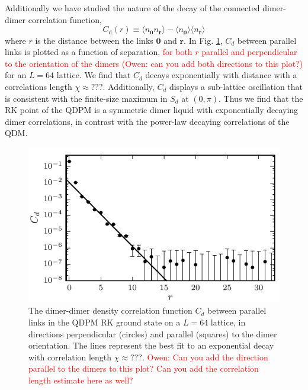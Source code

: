 \documentclass[twocolumn,prb,aps,floatfix,superscriptaddress]{revtex4-1}
\newcommand{\figref}[1]{Fig. \ref{#1}}
\newcommand{\note}[1]{\textcolor{red}{#1}}
\begin{document}
Additionally we have studied the nature of the decay of the connected dimer-dimer correlation function,
  \begin{equation}
    C_{\mathrm{d}} \left(r\right) \equiv \langle n_{\bm{0}} n_{\bm{r}} \rangle - \langle n_{\bm{0}} \rangle   \langle n_{\bm{r}} \rangle   
\end{equation}
where $r$ is the distance between the links $\bm{0}$ and $\bm{r}$. In \figref{fig:spatial_dmr_cor}, $C_d$ between parallel links is plotted as a function of separation, \textcolor{red}{for both $r$ parallel and perpendicular to the orientation of the dimers} \note{(Owen: can you add both directions to this plot?)} for an $L=64$ lattice. We find that $C_d$ decays exponentially with distance with a correlations length  $\chi\approx???$. Additionally, $C_d$ displays a sub-lattice oscillation that is consistent with the finite-size maximum in $S_d$ at $(0,\pi)$. Thus we find that the RK point of the QDPM is a symmetric dimer liquid with exponentially decaying dimer correlations, in contrast with the power-law decaying correlations of the QDM.

\begin{figure}
    \centering
    \includegraphics[width=1.0\columnwidth]{spatial_cors_parallel.pdf}
    \caption{The dimer-dimer density correlation function $C_d$ between parallel links in the QDPM RK ground state on a $L=64$ lattice, in directions perpendicular (circles) and parallel (squares) to the dimer orientation.  The lines represent the best fit to an exponential decay with correlation length $\chi\approx???$. \note{Owen: Can you add the direction parallel to the dimers to this plot? Can you add the correlation length estimate here as well?}}
    \label{fig:spatial_dmr_cor}
\end{figure}
\end{document}
